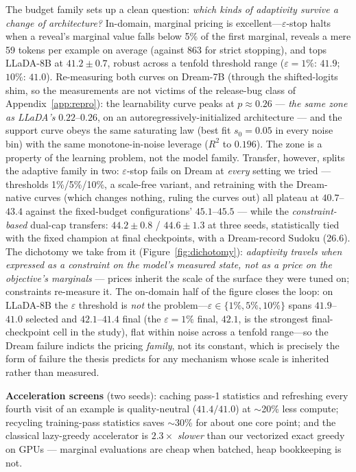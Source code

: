 \documentclass{article} %
\begin{document}
The budget family sets up a clean question: \emph{which kinds of adaptivity survive a change of architecture?} In-domain, marginal pricing is excellent---$\varepsilon$-stop halts when a reveal's marginal value falls below 5\% of the first marginal, reveals a mere 59 tokens per example on average (against 863 for strict stopping), and tops LLaDA-8B at $41.2 \pm 0.7$, robust across a tenfold threshold range ($\varepsilon{=}1\%$: $41.9$; $10\%$: $41.0$). Re-measuring both curves on Dream-7B (through the shifted-logits shim, so the measurements are not victims of the release-bug class of Appendix~\ref{app:repro}): the learnability curve peaks at $p \approx 0.26$ --- \emph{the same zone as LLaDA's} $0.22$--$0.26$, on an autoregressively-initialized architecture --- and the support curve obeys the same saturating law (best fit $s_0 = 0.05$ in every noise bin) with the same monotone-in-noise leverage ($R^2$ to $0.196$). The zone is a property of the learning problem, not the model family. Transfer, however, splits the adaptive family in two: $\varepsilon$-stop fails on Dream at \emph{every} setting we tried --- thresholds 1\%/5\%/10\%, a scale-free variant, and retraining with the Dream-native curves (which changes nothing, ruling the curves out) all plateau at $40.7$--$43.4$ against the fixed-budget configurations' $45.1$--$45.5$ --- while the \emph{constraint-based} dual-cap transfers: $44.2 \pm 0.8$ / $44.6 \pm 1.3$ at three seeds, statistically tied with the fixed champion at final checkpoints, with a Dream-record Sudoku (26.6). The dichotomy we take from it (Figure~\ref{fig:dichotomy}): \emph{adaptivity travels when expressed as a constraint on the model's measured state, not as a price on the objective's marginals} --- prices inherit the scale of the surface they were tuned on; constraints re-measure it. The on-domain half of the figure closes the loop: on LLaDA-8B the $\varepsilon$ threshold is \emph{not} the problem---$\varepsilon \in \{1\%, 5\%, 10\%\}$ spans $41.9$--$41.0$ selected and $42.1$--$41.4$ final (the $\varepsilon{=}1\%$ final, $42.1$, is the strongest final-checkpoint cell in the study), flat within noise across a tenfold range---so the Dream failure indicts the pricing \emph{family}, not its constant, which is precisely the form of failure the thesis predicts for any mechanism whose scale is inherited rather than measured.




\textbf{Acceleration screens} (two seeds): caching pass-1 statistics and refreshing every fourth visit of an example is quality-neutral ($41.4/41.0$) at $\sim$20\% less compute; recycling training-pass statistics saves $\sim$30\% for about one core point; and the classical lazy-greedy accelerator is $2.3\times$ \emph{slower} than our vectorized exact greedy on GPUs --- marginal evaluations are cheap when batched, heap bookkeeping is not.
\end{document}
